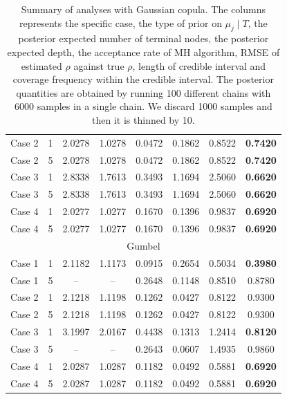 \documentclass{amsart}
\begin{document}
\begin{table}[ht]
{\begin{tabular}{lc|cccccc}
		Case 2 & 1 & 2.0278 & 1.0278 & 0.0472 & 0.1862 & 0.8522 & \textbf{0.7420} \\ 
		Case 2 & 5 & 2.0278 & 1.0278 & 0.0472 & 0.1862 & 0.8522 & \textbf{0.7420} \\ 
		Case 3 & 1 & 2.8338 & 1.7613 & 0.3493 & 1.1694 & 2.5060 & \textbf{0.6620} \\ 
		Case 3 & 5 & 2.8338 & 1.7613 & 0.3493 & 1.1694 & 2.5060 & \textbf{0.6620} \\ 
		Case 4 & 1 & 2.0277 & 1.0277 & 0.1670 & 0.1396 & 0.9837 & \textbf{0.6920} \\
		Case 4 & 5 & 2.0277 & 1.0277 & 0.1670 & 0.1396 & 0.9837 & \textbf{0.6920} \\
		\midrule
		\multicolumn{8}{c}{Gumbel} \\
		\midrule
		Case 1 & 1 & 2.1182 & 1.1173 & 0.0915 & 0.2654 & 0.5034 & \textbf{0.3980} \\ 
		Case 1 & 5 & -- & -- & 0.2648 & 0.1148 & 0.8510 & 0.8780 \\
		Case 2 & 1 & 2.1218 & 1.1198 & 0.1262 & 0.0427 & 0.8122 & 0.9300 \\ 
		Case 2 & 5 & 2.1218 & 1.1198 & 0.1262 & 0.0427 & 0.8122 & 0.9300 \\ 
		Case 3 & 1 & 3.1997 & 2.0167 & 0.4438 & 0.1313 & 1.2414 & \textbf{0.8120} \\ 
		Case 3 & 5 & -- & -- & 0.2643 & 0.0607 & 1.4935 & 0.9860 \\
		Case 4 & 1 & 2.0287 & 1.0287 & 0.1182 & 0.0492 & 0.5881 & \textbf{0.6920} \\ 
		Case 4 & 5 & 2.0287 & 1.0287 & 0.1182 & 0.0492 & 0.5881 & \textbf{0.6920} \\ 
		\bottomrule
		\end{tabular}}
	\caption{Summary of analyses with Gaussian copula. The columns represents the specific case, the type of prior on $\mu_j\mid T$, the posterior expected number of terminal nodes, the posterior expected depth, the acceptance rate of MH algorithm, RMSE of estimated $\rho$ against true $\rho$, length of credible interval and coverage frequency within the credible interval. The posterior quantities are obtained by running 100 different chains with 6000 samples in a single chain. We discard 1000 samples and then it is thinned by 10.}
	\label{tab:gauss:summary}
\end{table}
\end{document}
